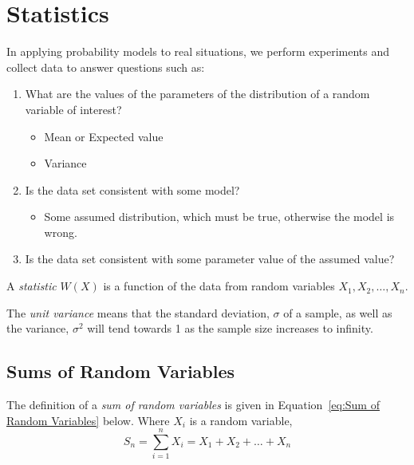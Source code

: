 \section{Statistics} \label{sec:Statistics}
In applying probability models to real situations, we perform experiments and collect data to answer questions such as:
	\begin{enumerate}
		\item What are the values of the parameters of the distribution of a random variable of interest?
			\begin{itemize}[noitemsep, nolistsep]
				\item Mean or Expected value
				\item Variance
			\end{itemize}
		
		\item Is the data set consistent with some model?
			\begin{itemize}[noitemsep, nolistsep]
				\item Some assumed distribution, which must be true, otherwise the model is wrong.
			\end{itemize}
		
		\item Is the data set consistent with some parameter value of the assumed value?
	\end{enumerate}

	\begin{definition}[Statistic] \label{def:Statistic}
		A \emph{statistic} $W (X)$ is a function of the data from random variables $X_{1},X_{2},\ldots,X_{n}$.
	\end{definition}
	\begin{definition} \label{def:Unit Variance}
		The \emph{unit variance} means that the standard deviation, $\sigma$ of a sample, as well as the variance, $\sigma^{2}$ will tend towards 1 as the sample size increases to infinity.
	\end{definition}
	\subsection{Sums of Random Variables} \label{subsec:Sums of Random Variables}
		\begin{definition} \label{def:Sum of Random Variables}
			The definition of a \emph{sum of random variables} is given in Equation~\eqref{eq:Sum of Random Variables} below.
			Where $X_{i}$ is a random variable,
			\begin{equation} \label{eq:Sum of Random Variables}
				S_{n} = \sum_{i=1}^{n} X_{i} = X_{1} + X_{2} + \ldots + X_{n}
			\end{equation}
		\end{definition}
	

